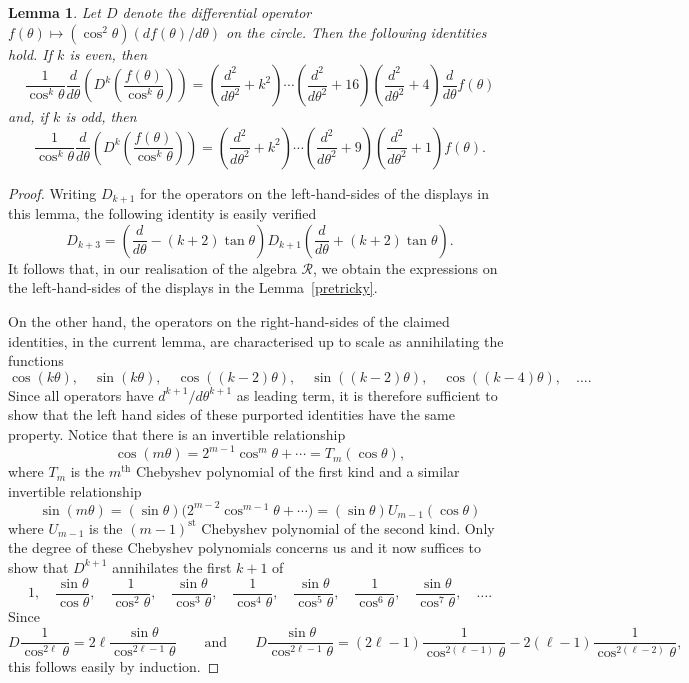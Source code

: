 \documentclass[11pt]{article}
\newtheorem{lemma}{Lemma}
\begin{document}
\begin{lemma}\label{tricky} Let $D$ denote the differential operator
$f(\theta)\mapsto (\cos^2\theta)(df(\theta)/d\theta)$ on the circle. Then the
following identities hold. If $k$ is even, then
\[\frac{1}{\cos^k\theta}\frac{d}{d\theta}
\left(D^k\left(\frac{f(\theta)}{\cos^k\theta}\right)\right)
=\left(\frac{d^2}{d\theta^2}+k^2\right)\cdots
\left(\frac{d^2}{d\theta^2}+16\right)
\left(\frac{d^2}{d\theta^2}+4\right)\frac{d}{d\theta}f(\theta)\] and, if $k$ is
odd, then \[\frac{1}{\cos^k\theta}\frac{d}{d\theta}
\left(D^k\left(\frac{f(\theta)}{\cos^k\theta}\right)\right)
=\left(\frac{d^2}{d\theta^2}+k^2\right)\cdots
\left(\frac{d^2}{d\theta^2}+9\right)
\left(\frac{d^2}{d\theta^2}+1\right)f(\theta).\]
\end{lemma}
\begin{proof} Writing $D_{k+1}$ for the operators on the left-hand-sides of the
displays in this lemma,  the following identity is easily verif\/ied
\[
D_{k+3} = \left( \frac{d} { d\theta}
-(k + 2) \tan \theta\right)D_{k+1}\left( \frac{d}{ d \theta} + (k + 2) \tan \theta\right).\]
It follows that, in our realisation of the algebra ${\mathcal{R}}$,
we obtain the expressions on the left-hand-sides of the displays in
the Lemma~\ref{pretricky}.

On the other hand, the operators on the right-hand-sides of the
claimed identities, in the current lemma, are characterised up to scale
as annihilating the functions
\[\cos(k\theta),\quad \sin(k\theta),\quad \cos((k-2)\theta),\quad
\sin((k-2)\theta),\quad \cos((k-4)\theta),\quad \dots.\]
Since all operators have $d^{k+1}/d\theta^{k+1}$ as leading term, it is
therefore suf\/f\/icient to show that the left hand sides of these purported
identities have the same property. Notice that there is an invertible
relationship
\[\cos(m\theta)=2^{m-1}\cos^m\theta+\cdots=T_m(\cos\theta),\]
where $T_m$ is the $m^{\mathrm{th}}$ Chebyshev polynomial of the f\/irst kind
and a similar invertible relationship
\[\sin(m\theta)=(\sin\theta)\big(2^{m-2}\cos^{m-1}\theta+\cdots\big)
=(\sin\theta)U_{m-1}(\cos\theta)\]
where $U_{m-1}$ is the $(m-1)^{\mathrm{st}}$ Chebyshev polynomial of the
second kind. Only the degree of these Chebyshev polynomials concerns us and
it now suf\/f\/ices to show that $D^{k+1}$ annihilates the f\/irst $k+1$ of
\[1,\quad\frac{\sin\theta}{\cos\theta},\quad
\frac{1}{\cos^2\theta},\quad\frac{\sin\theta}{\cos^3\theta},\quad
\frac{1}{\cos^4\theta},\quad\frac{\sin\theta}{\cos^5\theta},\quad
\frac{1}{\cos^6\theta},\quad \frac{\sin\theta}{\cos^7\theta},\quad\dots.\]
Since
\[D\frac{1}{\cos^{2\ell}\theta}=2\ell\frac{\sin\theta}{\cos^{2\ell-1}\theta}
\qquad\mbox{and}\qquad
D\frac{\sin\theta}{\cos^{2\ell-1}\theta}
=(2\ell-1)\frac{1}{\cos^{2(\ell-1)}\theta}
-2(\ell-1)\frac{1}{\cos^{2(\ell-2)}\theta},\]
this follows easily by induction.
\end{proof}
\setcounter{section}{6}
\setcounter{subsection}{0}
\setcounter{subsubsection}{0}
\setcounter{equation}{20}
\renewcommand{\thesection}{Appendix:}
\end{document}
